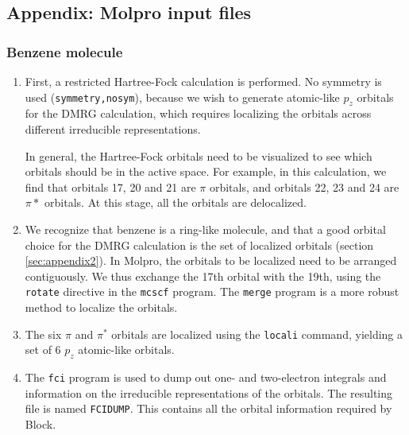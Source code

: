 \documentclass[letterpaper,12pt,aps, pra]{revtex4-1}
\begin{document}
\subsection{Appendix: Molpro input files}\label{sec:appMolpro}

 \subsubsection{Benzene molecule}
 \label{sec:appMolprobenz}
\begin{enumerate}

 \item First, a restricted Hartree-Fock calculation is performed. No symmetry
	 is used (\texttt{symmetry,nosym}), because we wish to generate
	 atomic-like $p_z$ orbitals for the DMRG calculation, which requires
	 localizing the orbitals across different irreducible representations. 

In general, the Hartree-Fock orbitals need to be visualized to see which
orbitals should be in the active space. For example, in this calculation, we
find that orbitals 17, 20 and 21 are $\pi$ orbitals, and orbitals 22, 23 and 24
are $\pi*$ orbitals.  At this stage, all the orbitals are delocalized.


\item We recognize that benzene is a ring-like molecule, and that a good
	orbital choice for the DMRG calculation is the set of localized
	orbitals (section \ref{sec:appendix2}). In Molpro, the orbitals to be
	localized need to be arranged contiguously. We thus exchange the 17th
	orbital with the 19th, using the \texttt{rotate} directive in the
	\texttt{mcscf} program. The \texttt{merge} program is a more robust
	method to localize the orbitals.


\item The six $\pi$ and $\pi^*$ orbitals are localized using the
	\texttt{locali} command, yielding a set of 6 $p_z$ atomic-like
	orbitals. 

\item The \texttt{fci} program is used to dump out one- and two-electron
integrals and information on the irreducible representations of the orbitals.
The resulting file is named \texttt{FCIDUMP}. This contains all the orbital
information required by Block.  \end{enumerate}
\end{document}
